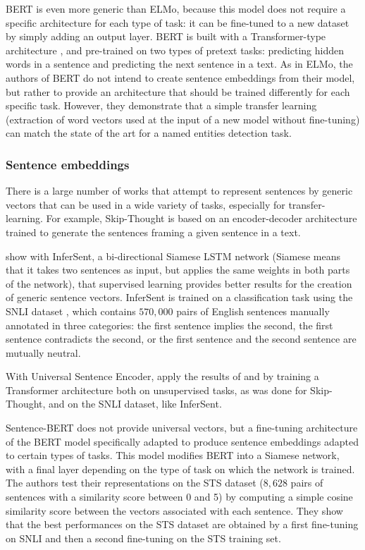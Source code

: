 BERT \citep{devlin2018bert} is even more generic than ELMo, because this model does not require a specific architecture for each type of task: it can be fine-tuned to a new dataset by simply adding an output layer. BERT is built with a Transformer-type architecture \citep{vaswani2017attention}, and pre-trained on two types of pretext tasks: predicting hidden words in a sentence and predicting the next sentence in a text. As in ELMo, the authors of BERT do not intend to create sentence embeddings from their model, but rather to provide an architecture that should be trained differently for each specific task. However, they demonstrate that a simple transfer learning (extraction of  word vectors used at the input of a new model without fine-tuning) can match the state of the art for a named entities detection task.

\subsubsection{Sentence embeddings}
\label{embedding_phrases}
There is a large number of works that attempt to represent sentences by generic vectors that can be used in a wide variety of tasks, especially for transfer-learning. 
For example, Skip-Thought \citep{kiros2015skip} is based on an encoder-decoder architecture trained to generate the sentences framing a given sentence in a text.

\citet{conneau2017supervised} show with InferSent, a bi-directional Siamese LSTM network (Siamese means that it takes two sentences as input, but applies the same weights in both parts of the network), that supervised learning provides better results for the creation of generic sentence vectors. InferSent is trained on a classification task using the SNLI dataset \citep{bowman2015large}, which contains $570,000$ pairs of English sentences manually annotated in three categories: the first sentence implies the second, the first sentence contradicts the second, or the first sentence and the second sentence are mutually neutral.

With Universal Sentence Encoder, \citet{cer2018universal} apply the results of \citet{kiros2015skip} and \citet{conneau2017supervised} by training a Transformer architecture both on unsupervised tasks, as was done for Skip-Thought, and on the SNLI dataset, like InferSent. 

Sentence-BERT \citep{reimers_2019_sentence} does not provide universal vectors, but a fine-tuning architecture of the BERT model specifically adapted to produce sentence embeddings adapted to certain types of tasks. This model modifies BERT into a Siamese network, with a final layer depending on the type of task on which the network is trained. The authors test their representations on the STS dataset \citep{cer2017semeval} ($8,628$ pairs of sentences with a similarity score between 0 and 5) by computing a simple cosine similarity score between the vectors associated with each sentence. They show that the best performances on the STS dataset are obtained by a first fine-tuning on SNLI and then a second fine-tuning on the STS training set.

